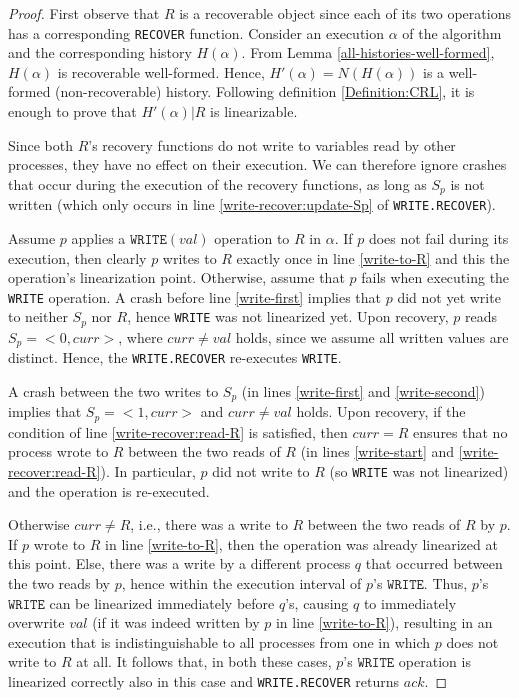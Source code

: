 \begin{proof}
First observe that $R$ is a recoverable object since each of its two operations has a corresponding \texttt{RECOVER} function. Consider an execution $\alpha$ of the algorithm and the corresponding history $H(\alpha)$. From Lemma \ref{all-histories-well-formed}, $H(\alpha)$ is recoverable well-formed. Hence, $H'(\alpha)=N(H(\alpha))$ is a well-formed (non-recoverable) history. Following definition \ref{Definition:CRL}, it is enough to prove that $H'(\alpha) | R$ is  linearizable.
	
Since both $R$'s recovery functions do not write to variables read by other processes, they have no effect on their execution. We can therefore ignore crashes that occur during the execution of the recovery functions, as long as $S_p$ is not written (which only occurs in line \ref{write-recover:update-Sp} of \texttt{WRITE.RECOVER}).

Assume $p$ applies a $\texttt{WRITE}(val)$ operation to $R$ in $\alpha$. If $p$ does not fail during its execution, then clearly $p$ writes to $R$ exactly once in line \ref{write-to-R} and this the operation's linearization point. Otherwise, assume that $p$ fails when executing the \texttt{WRITE} operation. A crash before line \ref{write-first} implies that $p$ did not yet write to neither $S_p$ nor $R$, hence \texttt{WRITE} was not linearized yet. Upon recovery, $p$ reads $S_p=<0,curr>$, where $curr \neq val$ holds, since we assume all written values are distinct. Hence, the \texttt{WRITE.RECOVER} re-executes \texttt{WRITE}.

A crash between the two writes to $S_p$ (in lines \ref{write-first} and \ref{write-second}) implies that $S_p={<}1,curr{>}$ and $curr \neq val$ holds. Upon recovery, if the condition of line \ref{write-recover:read-R} is satisfied, then $curr = R$ ensures that no process wrote to $R$ between the two reads of $R$ (in lines \ref{write-start} and \ref{write-recover:read-R}). In particular, $p$ did not write to $R$ (so \texttt{WRITE} was not linearized) and the operation is re-executed.

Otherwise $curr \neq R$, i.e., there was a write to $R$ between the two reads of $R$ by $p$. If $p$ wrote to $R$ in line \ref{write-to-R}, then the operation was already linearized at this point. Else, there was a write by a different process $q$ that occurred between the two reads by $p$, hence within the execution interval of $p$'s $\texttt{WRITE}$. Thus, $p$'s $\texttt{WRITE}$ can be linearized immediately before $q$'s, causing $q$ to immediately overwrite $val$ (if it was indeed written by $p$ in line \ref{write-to-R}), resulting in an execution that is indistinguishable to all processes from one in which $p$ does not write to $R$ at all. It follows that, in both these cases, $p$'s $\texttt{WRITE}$ operation is linearized correctly also in this case and \texttt{WRITE.RECOVER} returns $ack$.


\end{proof}
